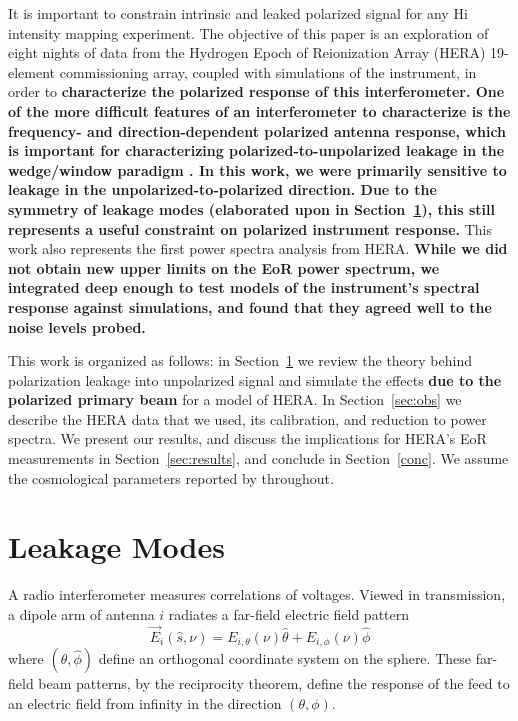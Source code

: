 \documentclass[twocolumn, trackchanges]{aastex61}
\newcommand{\edited}[1]{{\bf \color{red} #1}}
\begin{document}
It is important to constrain intrinsic and leaked polarized signal for any {\sc Hi} intensity mapping experiment. The objective of this paper is an exploration of eight nights of data from the Hydrogen Epoch of Reionization Array (HERA) 19-element commissioning array, coupled with simulations of the instrument, in order to \edited{characterize the polarized response of this interferometer.  
One of the more difficult features of an interferometer to characterize is the frequency- and direction-dependent polarized antenna response, which is important for characterizing polarized-to-unpolarized leakage in the wedge/window paradigm \citep{Moore17,Nunhokee.17,Martinot18}.
In this work, we were primarily sensitive to leakage in the unpolarized-to-polarized direction. Due to the symmetry of leakage modes (elaborated upon in Section~\ref{sec:leak}), this still represents a useful constraint on polarized instrument response.} 
This work also represents the first power spectra analysis from HERA. \edited{While we did not obtain new upper limits on the EoR power spectrum, we integrated deep enough to test models of the instrument's spectral response against simulations, and found that they agreed well to the noise levels probed.}

This work is organized as follows: in Section~\ref{sec:leak} we review the theory behind polarization leakage into unpolarized signal and simulate the effects \edited{due to the polarized primary beam} for a model of HERA. In Section~\ref{sec:obs} we describe the HERA data that we used, its calibration, and reduction to power spectra. We present our results, and discuss the implications for HERA's EoR measurements in Section~\ref{sec:results}, and conclude in Section~\ref{conc}. We assume the cosmological parameters reported by \cite{Planck.16} throughout.

\section{Leakage Modes}
\label{sec:leak}

A radio interferometer measures correlations of voltages. Viewed in transmission, a dipole arm of antenna $i$ radiates a far-field electric field pattern
\begin{equation}
\vec{E}_{i}(\hat{s}, \nu) = E_{i,\theta}(\nu)\hat{\theta} + E_{i,\phi}(\nu)\hat{\phi}
\end{equation}
where $(\hat{\theta},\hat{\phi})$ define an orthogonal coordinate system on the sphere. These far-field beam patterns, by the reciprocity theorem, define the response of the feed to an electric field from infinity in the direction $(\theta,\phi)$. 
\end{document}
